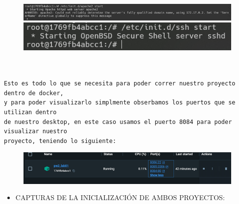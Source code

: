 \documentclass{article}
\begin{document}
\begin{figure}[h]
    \centering
    \includegraphics[width=1\textwidth]{img/15.png}
    \includegraphics[width=1\textwidth]{img/16.png}
    
    
    \label{fig:imagen}
\end{figure}






\begin{flushleft}
\begin{verbatim}


Esto es todo lo que se necesita para poder correr nuestro proyecto dentro de docker,
y para poder visualizarlo simplmente obserbamos los puertos que se utilizan dentro
de nuestro desktop, en este caso usamos el puerto 8084 para poder visualizar nuestro
proyecto, teniendo lo siguiente:
\end{verbatim}
\end{flushleft}

\begin{figure}[h]
    \centering
    \includegraphics[width=1\textwidth]{img/17.png}    
    \label{fig:imagen}
\end{figure}


\begin{itemize}		
    \item 
    CAPTURAS DE LA INICIALIZACIÓN DE AMBOS PROYECTOS:
\end{itemize}
\end{document}
